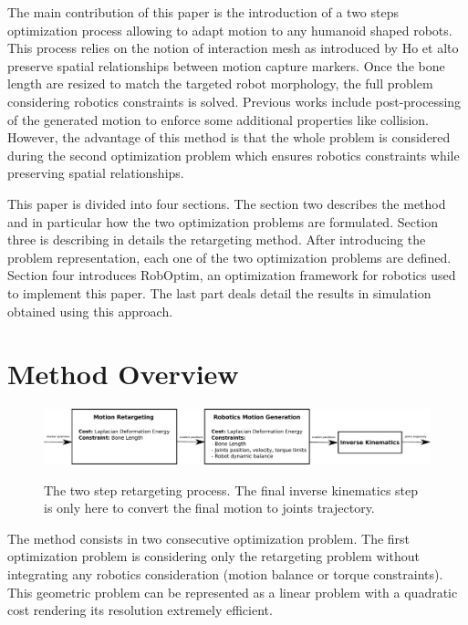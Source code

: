 \documentclass[letterpaper, 10 pt, conference]{ieeeconf}  %
\begin{document}
The main contribution of this paper is the introduction of a two steps
optimization process allowing to adapt motion to any humanoid shaped
robots. This process relies on the notion of interaction mesh as
introduced by Ho et al\. to preserve spatial relationships between
motion capture markers. Once the bone length are resized to match the
targeted robot morphology, the full problem considering robotics
constraints is solved. Previous works include post-processing of the
generated motion to enforce some additional properties like
collision. However, the advantage of this method is that the whole
problem is considered during the second optimization problem which
ensures robotics constraints while preserving spatial relationships.


This paper is divided into four sections. The section two describes
the method and in particular how the two optimization problems are
formulated. Section three is describing in details the retargeting
method. After introducing the problem representation, each one of the
two optimization problems are defined. Section four introduces
RobOptim, an optimization framework for robotics used to implement
this paper. The last part deals detail the results in simulation
obtained using this approach.


\section{Method Overview}
\label{sec:overview}

\begin{figure}[htbp!]
  \includegraphics[width=\linewidth]{figure/architecture.pdf}
  \label{fig:algorithm}
  \caption{The two step retargeting process. The final inverse
    kinematics step is only here to convert the final motion to joints
    trajectory.}
\end{figure}


The method consists in two consecutive optimization problem. The first
optimization problem is considering only the retargeting problem
without integrating any robotics consideration (motion balance or
torque constraints). This geometric problem can be represented as a
linear problem with a quadratic cost rendering its resolution
extremely efficient.
\end{document}

